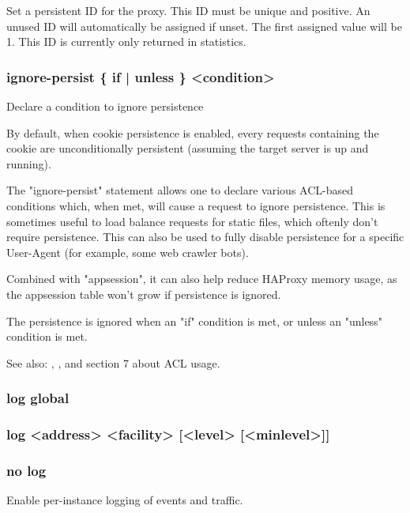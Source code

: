   Set a persistent ID for the proxy. This ID must be unique and positive.
  An unused ID will automatically be assigned if unset. The first assigned
  value will be 1. This ID is currently only returned in statistics.

\subsubsection[ignore-persist]{ignore-persist \{ if | unless \} <condition>}
  Declare a condition to ignore persistence


  By default, when cookie persistence is enabled, every requests containing
  the cookie are unconditionally persistent (assuming the target server is up
  and running).

  The "ignore-persist" statement allows one to declare various ACL-based
  conditions which, when met, will cause a request to ignore persistence.
  This is sometimes useful to load balance requests for static files, which
  oftenly don't require persistence. This can also be used to fully disable
  persistence for a specific User-Agent (for example, some web crawler bots).

  Combined with "appsession", it can also help reduce HAProxy memory usage, as
  the appsession table won't grow if persistence is ignored.

  The persistence is ignored when an "if" condition is met, or unless an
  "unless" condition is met.

  See also: , , and section 7 about ACL usage.

\subsubsection[log global]{log global}
\subsubsection[log]{log <address> <facility> [<level> [<minlevel>]]}
\subsubsection[no log]{no log}


  Enable per-instance logging of events and traffic.
  

